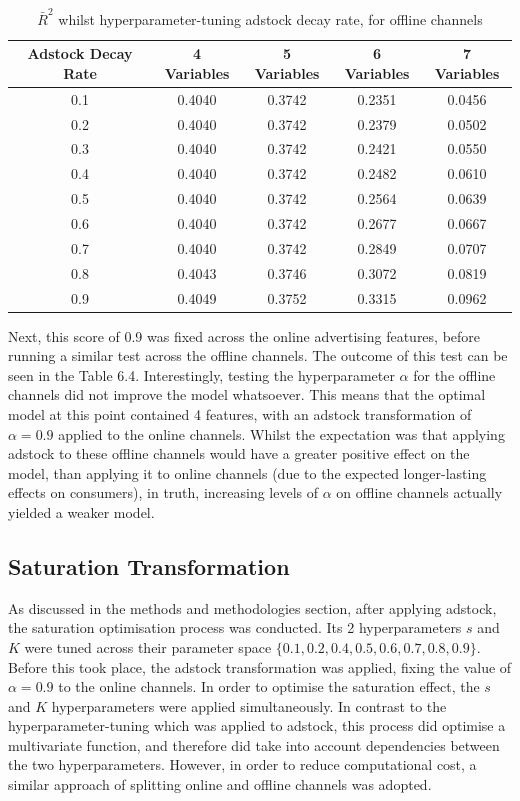 \documentclass[11pt, a4paper]{article}
\begin{document}
\begin{table}[h!]
    \centering
    \begin{tabular}{c|cccc}
        \toprule
        \textbf{Adstock Decay Rate} & \textbf{4 Variables} & \textbf{5 Variables} & \textbf{6 Variables} & \textbf{7 Variables} \\
        \midrule
        0.1 & 0.4040 & 0.3742 & 0.2351 & 0.0456 \\
        0.2 & 0.4040 & 0.3742 & 0.2379 & 0.0502 \\
        0.3 & 0.4040 & 0.3742 & 0.2421 & 0.0550 \\
        0.4 & 0.4040 & 0.3742 & 0.2482 & 0.0610 \\
        0.5 & 0.4040 & 0.3742 & 0.2564 & 0.0639 \\
        0.6 & 0.4040 & 0.3742 & 0.2677 & 0.0667 \\
        0.7 & 0.4040 & 0.3742 & 0.2849 & 0.0707 \\
        0.8 & 0.4043 & 0.3746 & 0.3072 & 0.0819 \\
        0.9 & 0.4049 & 0.3752 & 0.3315 & 0.0962 \\
        \bottomrule
    \end{tabular}

    \caption{$\bar{R}^2$
whilst hyperparameter-tuning adstock decay rate, for offline channels}
    \label{tab:adstock_r2}
\end{table}


Next, this score of 0.9 was fixed across the online advertising features, before running a similar test across the offline channels. The outcome of this test can be seen in the Table 6.4. Interestingly, testing the hyperparameter $\alpha$ for the offline channels did not improve the model whatsoever. This means that the optimal model at this point contained 4 features, with an adstock transformation of $\alpha = 0.9$ applied to the online channels. Whilst the expectation was that applying adstock to these offline channels would have a greater positive effect on the model, than applying it to online channels (due to the expected longer-lasting effects on consumers), in truth, increasing levels of $\alpha$ on offline channels actually yielded a weaker model. 


\subsection{Saturation Transformation}

As discussed in the methods and methodologies section, after applying adstock, the saturation optimisation process was conducted. Its 2 hyperparameters $s$ and $K$ were tuned across their parameter space $\{0.1, 0.2, 0.4, 0.5, 0.6, 0.7, 0.8, 0.9\}$. Before this took place, the adstock transformation was applied, fixing the value of $\alpha = 0.9$ to the online channels. In order to optimise the saturation effect, the $s$ and $K$ hyperparameters were applied simultaneously. In contrast to the hyperparameter-tuning which was applied to adstock, this process did optimise a multivariate function, and therefore did take into account dependencies between the two hyperparameters. However, in order to reduce computational cost, a similar approach of splitting online and offline channels was adopted. 
\end{document}

